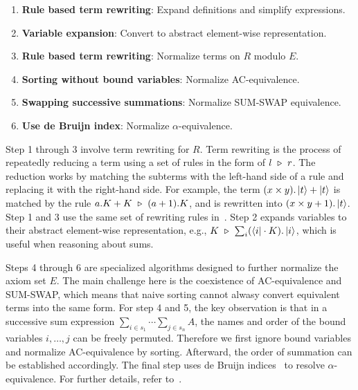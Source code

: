 \begin{enumerate}
    \item \textbf{Rule based term rewriting}: Expand definitions and simplify expressions.
    \item \textbf{Variable expansion}: Convert to abstract element-wise representation.
    \item \textbf{Rule based term rewriting}: Normalize terms on \( R \) modulo \( E \).
    \item \textbf{Sorting without bound variables}: Normalize AC-equivalence.
    \item \textbf{Swapping successive summations}: Normalize SUM-SWAP equivalence.
    \item \textbf{Use de Bruijn index}: Normalize \( \alpha \)-equivalence.
\end{enumerate}

Step 1 through 3 involve term rewriting for $R$. 
Term rewriting is the process of repeatedly reducing a term using a set of rules in the form of $l\ \reduce\ r$. The reduction works by matching the subterms with the left-hand side of a rule and replacing it with the right-hand side. 
For example, the term $(x\times y) . \ket{t} + \ket{t}$ is matched by the rule $a.K + K\ \triangleright\ (a + 1).K$, and is rewritten into $(x\times y + 1) . \ket{t}$.
Step 1 and 3 use the same set of rewriting rules in~.
Step 2 expands variables to their abstract element-wise representation, e.g., $K \ \triangleright\ \sum_{i} (\bra{i} \cdot K). \ket{i}$, which is useful when reasoning about sums. 


Steps 4 through 6 are specialized algorithms designed to further normalize the axiom set $E$.
The main challenge here is the coexistence of AC-equivalence and SUM-SWAP, which means that naive sorting cannot alwasy convert equivalent terms into the same form.
For step 4 and 5, the key observation is that in a successive sum expression \( \sum_{i \in s_1} \cdots \sum_{j \in s_n} A \), the names and order of the bound variables \( i, \dots, j \) can be freely permuted. Therefore we first ignore bound variables and normalize AC-equivalence by sorting. Afterward, the order of summation can be established accordingly. The final step uses de Bruijn indices~\cite{deBruijn1972lambda} to resolve $\alpha$-equivalence. For further details, refer to~.



